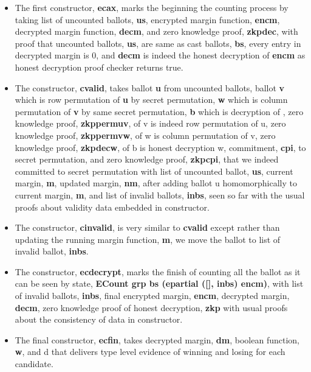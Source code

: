 \documentclass{llncs}
\begin{document}
 
 
\begin{itemize}
\item The first constructor, \textbf{ecax}, marks the beginning the counting process by 
	  taking list of uncounted ballots, \textbf{us},
      encrypted margin function, \textbf{encm}, decrypted margin function, \textbf{decm}, 
      and zero knowledge proof, \textbf{zkpdec}, with proof that uncounted 
      ballots, \textbf{us}, are same as 
      cast ballots, \textbf{bs}, every entry in decrypted margin is 0, and 
      \textbf{decm} is indeed the 
      honest decryption of \textbf{encm} as honest decryption proof checker returns true.
 \item The constructor, \textbf{cvalid}, takes ballot \textbf{u} from uncounted 
 		ballots, ballot 
 		\textbf{v} which is row permutation of \textbf{u }by secret permutation, 
 		\textbf{w} which is column permutation of \textbf{v} by same secret permutation, 
 		\textbf{b} which is decryption of , zero knowledge proof, 
 		\textbf{zkppermuv}, of v is indeed row permutation of u, 
 		zero knowledge proof, \textbf{zkppermvw}, of w is column permutation of 
 		v, zero knowledge proof, \textbf{zkpdecw}, of b is honest decryption w,
 		commitment, \textbf{cpi}, to secret permutation, and zero knowledge proof, 
 		\textbf{zkpcpi}, that we indeed committed to secret permutation 
 		with list of uncounted ballot, \textbf{us}, current margin, \textbf{m}, 
 		updated margin, \textbf{nm}, after adding ballot u homomorphically to 
 		current margin, \textbf{m}, and list of invalid ballots, \textbf{inbs}, 
 		seen so far with the usual proofs about validity data embedded in constructor. 
 \item The constructor, \textbf{cinvalid}, is very similar to \textbf{cvalid} except 
       rather than updating the running margin function, \textbf{m}, we move the ballot 
       to list of invalid ballot, \textbf{inbs}.
 \item The constructor, \textbf{ecdecrypt}, marks the finish of counting all the 
       ballot as it can be seen by state, 
       \textbf{ ECount grp bs (epartial ([], inbs) encm)}, with list of 
       invalid ballots, \textbf{inbs}, final encrypted margin, \textbf{encm}, 
       decrypted margin, \textbf{decm}, zero knowledge proof of honest 
       decryption, \textbf{zkp} with usual proofs about the consistency of data 
       in constructor. 
 \item The final constructor, \textbf{ecfin}, takes decrypted margin, \textbf{dm}, 
       boolean function, \textbf{w}, and d that delivers type level evidence of 
       winning and losing for each candidate.
   
\end{itemize}
\end{document}
